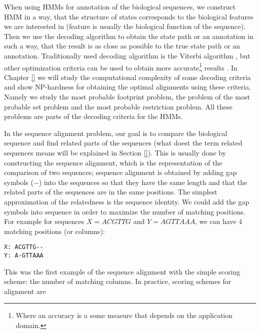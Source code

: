 When using HMMs for annotation of the biological sequences, we construct HMM in
a way, that the structure of states corresponds to the biological features we
are interested in (feature is usually the biological function of the sequence).
Then we use the decoding algorithm to obtain the state path or an annotation in
such a way, that the result is as close as possible to the true state path or
an annotation. Traditionally used decoding algorithm is the Viterbi algorithm
\cite{}, but other optimization criteria can be used to obtain more
accurate\footnote{Where an accuracy is a some measure that depends on the
application domain.} results \cite{}. In Chapter \ref{} we will study the
computational complexity of some decoding criteria and show NP-hardness for
obtaining the optimal alignments using these criteria. Namely we study the most
probable footprint problem, the problem of the most probable set problem and
the most probable restriction problem. All these problems are parts of the
decoding criteria for the HMMs.

In the sequence alignment problem, our goal is to compare the biological
sequence and find related parts of the sequences (what doest the term related
sequences means will be explained in Section \ref{}). This is usually done by
constructing the sequence alignment, which is the representation of the
comparison of two sequences; sequence alignment is obtained by adding gap
symbols ($-$) into the sequences so that they have the same length and that the
related parts of the sequences are in the same positions. The simplest
approximation of the relatedness is the sequence identity. We could add 
the gap symbols into sequence in order to maximize the number of matching positions.
For example for sequences $X=ACGTTG$ and $Y=AGTTAAA$, we can have $4$ matching positions (or columns):
\begin{verbatim}
X: ACGTTG--
Y: A-GTTAAA
\end{verbatim}
This was the first example of the sequence alignment with the simple scoring
scheme: the number of matching columns. In practice, scoring schemes for
alignment are 

